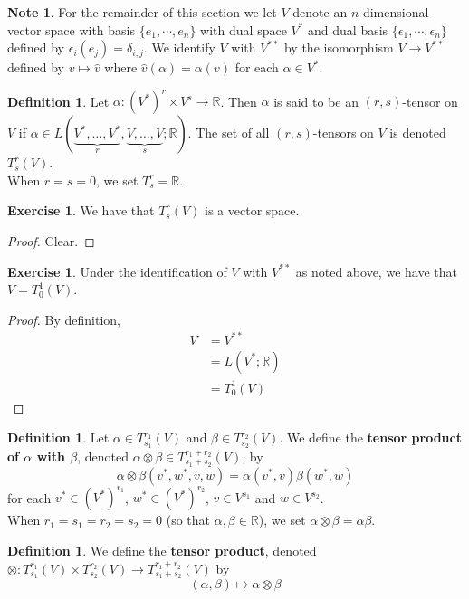 \documentclass[12pt]{amsart}
\theoremstyle{definition}
\newtheorem{defn}[definition]{Definition}
\newtheorem{note}[definition]{Note}
\theoremstyle{definition}
\newtheorem{ex}[definition]{Exercise}
\newcommand{\al}{\alpha}
\newcommand{\bet}{\beta}
\newcommand{\del}{\delta}
\newcommand{\ep}{\epsilon}
\newcommand{\R}{\mathbb{R}}
\newcommand{\Tn}[1]{T^{r_{#1}}_{s_{#1}}(V)}
\newcommand{\Tnp}{T^{r_1 + r_2}_{s_1 + s_2}(V)}
\begin{document}
	\begin{note}
		For the remainder of this section we let $V$ denote an $n$-dimensional vector space with basis $\{e_1, \cdots, e_n\}$ with dual space $V^*$ and dual basis $\{\ep_1, \cdots, \ep_n\}$ defined by $\ep_i(e_j) = \del_{i,j}$. We identify $V$ with $V^{**}$ by the isomorphism $V \rightarrow V^{**}$ defined by $v \mapsto \hat{v}$ where $\hat{v}(\al) = \al(v)$ for each $\al \in V^*$. 
	\end{note}	
	
	\begin{defn}
	Let $\al: (V^*)^r \times V^s \rightarrow \R$. Then $\al$ is said to be an $(r,s)$-tensor on $V$ if $\al \in L(\underbrace{V^*, \dots, V^*}_{r}, \underbrace{V, \dots, V}_{s}; \R)$. The set of all $(r,s)$-tensors on $V$ is denoted $T^r_s(V)$. \\
	When $r=s=0$, we set $T^r_s = \R$.
	\end{defn}
	
	\begin{ex}
		We have that $T^r_s(V)$ is a vector space. 
	\end{ex}

	\begin{proof}
		Clear.
	\end{proof}
	
	\begin{ex}
	Under the identification of $V$ with $V^{**}$ as noted above, we have that $V = T^1_0(V)$. 
	\end{ex}
	
	\begin{proof}
	By definition,
	\begin{align*}
	V 
	&= V^{**} \\
	&= L(V^*; \R) \\
	&= T^1_0(V)
	\end{align*}
	\end{proof}
	
	\begin{defn}
	Let $\al \in \Tn{1}$ and $\bet \in \Tn{2}$. We define the \textbf{tensor product of $\al$ with $\bet$}, denoted $\al \otimes \beta \in T^{r_1+r_2}_{s_1+s_2}(V)$, by $$\al \otimes \bet (v^*, w^*, v, w) = \al(v^*, v) \bet(w^*, w)$$ for each $v^* \in (V^*)^{r_1}$, $w^* \in (V^*)^{r_2}$, $v \in V^{s_1}$ and $w \in V^{s_2}$.\\
	When $r_1=s_1=r_2=s_2= 0$ (so that $\al, \bet \in \R$), we set $\al \otimes \bet = \al \bet$.
	\end{defn}
	
	\begin{defn}
	We define the \textbf{tensor product}, denoted $\otimes : \Tn{1} \times  \Tn{2} \rightarrow \Tnp$ by $$(\al, \bet) \mapsto \al \otimes \beta $$   
	\end{defn}
	
\end{document}

